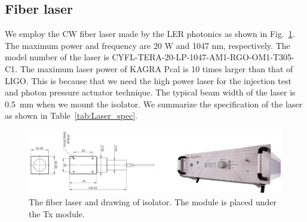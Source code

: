 \subsection{Fiber laser}
We employ the CW fiber laser made by the LER photonics as shown in Fig.~\ref{fig:Laser}. The maximum power and frequency are 20 W and 1047 nm, respectively. The model number of the laser is CYFL-TERA-20-LP-1047-AM1-RGO-OM1-T305-C1. The maximum laser power of KAGRA Pcal is 10 times larger than that of LIGO. This is because that we need the high power laser for the injection test and photon pressure actuator technique. The typical beam width of the laser is 0.5~mm when we mount the isolator. We summarize the specification of the laser as shown in Table~\ref{tab:Laser_spec}.

\begin{figure}
\begin{center}
\includegraphics[width=14cm]{Figures/Laser.eps}
\caption{The fiber laser and drawing of isolator. The module is placed under the Tx module.} 
\label{fig:Laser} 
\end{center}
\end{figure}

